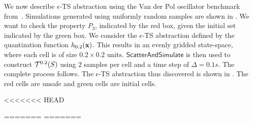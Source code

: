\begin{example} 
We now describe $\epsilon$-TS abstraction using the Van der Pol
oscillator benchmark from~\cite{zutshi2014multiple}. Simulations
generated using uniformly random samples are shown in
. We want to check the property $P_3$, indicated by
the red box, given the initial set indicated by the green box. We
consider the $\epsilon$-TS abstraction defined by the quantization
function $h_{0.2}(\mathbf{x})$. This results in an evenly gridded
state-space, where each cell is of size $0.2 \times 0.2$ units.
$\mathsf{ScatterAndSimulate}$ is then used to construct
$\mathcal{T}^{0.2}(S)$ using $2$ samples per cell and a time
step of $\Delta = 0.1s$. The complete process follows.  The
$\epsilon$-TS abstraction thus discovered is shown in
. The red cells are unsafe and green cells are initial
cells.
\end{example}

<<<<<<< HEAD

% 
% 
% 
=======
% 
=======

